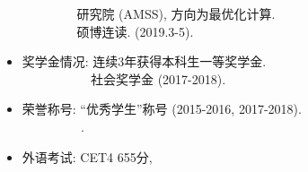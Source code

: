 \documentclass[10pt]{beamer}
\begin{document}
\begin{frame}
\begin{itemize}
{{$\quad\quad\quad\quad\,\,$研究院 (AMSS)}}, 方向为最优化计算.\\
$\quad\quad\quad\quad\,\,$硕博连读. {\color{red}{访问学者}} (2019.3-5).
\item 奖学金情况: {\color{red}连续3年获得本科生一等奖学金}.\\
$\quad\quad\quad\quad\quad\:\:$社会奖学金 (2017-2018).
\item 荣誉称号: ``优秀学生''称号 (2015-2016, 2017-2018).\\
$\quad\quad\quad\quad\:\:\:${\color{red}{``优秀学生标兵''称号 (2016-2017)}}.
\item 外语考试: CET4 655分,$\,${\color{red}{CET6 610分}}
\end{itemize}

\end{frame}
\end{document}
